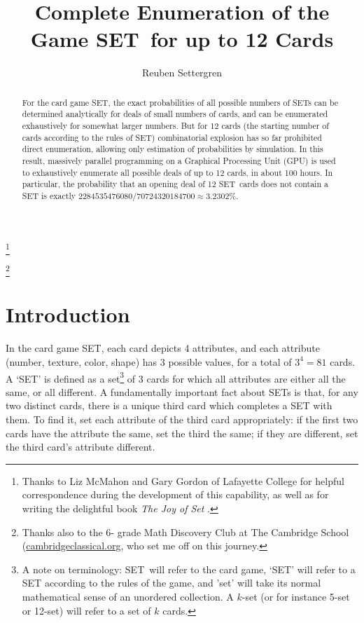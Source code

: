 \documentclass[10pt]{amsart}
\newcommand{\SETb}{SET\texttrademark\ } %
\newcommand{\SET}{SET\texttrademark}  %
\begin{document}
\title[SET Enumeration]{Complete Enumeration of the Game \SETb for up to 12 Cards}
\author[Settergren]{Reuben Settergren}

\thanks{Thanks to Liz McMahon and Gary Gordon of Lafayette College for helpful
  correspondence during the development of this capability, as well as for
  writing the delightful book {\em The Joy of Set} \cite{JOS}.}

\thanks{Thanks also to the 6- grade Math Discovery Club at The Cambridge
  School (\url{cambridgeclassical.org}, who set me off on this journey.}

\maketitle

\begin{abstract}
For the card game \SET, the exact probabilities of all possible numbers of SETs
can be determined analytically for deals of small numbers of cards, and can be
enumerated exhaustively for somewhat larger numbers. But for 12 cards (the
starting number of cards according to the rules of \SET) combinatorial explosion
has so far prohibited direct enumeration, allowing only estimation of
probabilities by simulation. In this result, massively parallel programming on a
Graphical Processing Unit (GPU) is used to exhaustively enumerate all possible
deals of up to 12 cards, in about 100 hours. In particular, the probability that
an opening deal of 12 \SETb cards does not contain a SET is exactly
$2284535476080/70724320184700 \approx 3.2302\%$.
\end{abstract}

\section{Introduction}
In the card game \SET\cite{SET}, each card depicts 4 attributes, and each
attribute (number, texture, color, shape) has 3 possible values, for a total of
$3^4=81$ cards. A `SET' is defined as a set\footnote{A note on terminology:
  \SETb will refer to the card game, `SET' will refer to a SET according to the
  rules of the game, and 'set' will take its normal mathematical sense of an
  unordered collection. A $k$-set (or for instance 5-set or 12-set) will refer
  to a set of $k$ cards.} of 3 cards for which all attributes are either all the
same, or all different. A fundamentally important fact about SETs is that, for
any two distinct cards, there is a unique third card which completes a SET with
them. To find it, set each attribute of the third card appropriately: if the
first two cards have the attribute the same, set the third the same; if they are
different, set the third card's attribute different.
\end{document}
